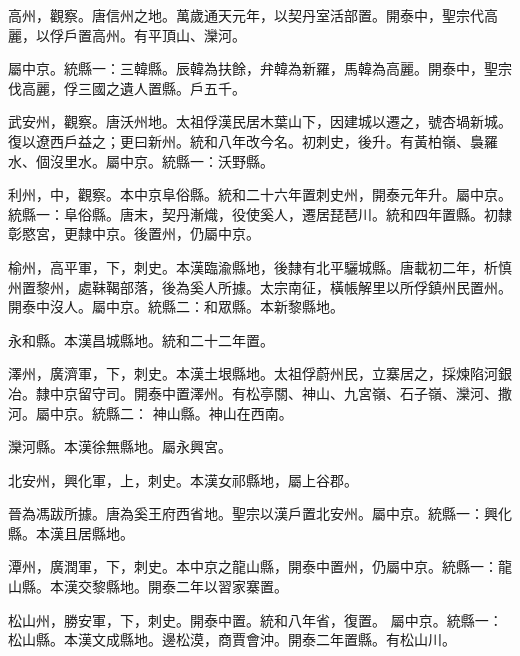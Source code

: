 \begin{pinyinscope}
 高州，觀察。唐信州之地。萬歲通天元年，以契丹室活部置。開泰中，聖宗代高麗，以俘戶置高州。有平頂山、灤河。



 屬中京。統縣一：三韓縣。辰韓為扶餘，弁韓為新羅，馬韓為高麗。開泰中，聖宗伐高麗，俘三國之遺人置縣。戶五千。



 武安州，觀察。唐沃州地。太祖俘漢民居木葉山下，因建城以遷之，號杏堝新城。復以遼西戶益之；更曰新州。統和八年改今名。初刺史，後升。有黃柏嶺、裊羅水、個沒里水。屬中京。統縣一：沃野縣。



 利州，中，觀察。本中京阜俗縣。統和二十六年置刺史州，開泰元年升。屬中京。統縣一：阜俗縣。唐末，契丹漸熾，役使奚人，遷居琵琶川。統和四年置縣。初隸彰愍宮，更隸中京。後置州，仍屬中京。



 榆州，高平軍，下，刺史。本漢臨渝縣地，後隸有北平驪城縣。唐載初二年，析慎州置黎州，處靺鞨部落，後為奚人所據。太宗南征，橫帳解里以所俘鎮州民置州。開泰中沒人。屬中京。統縣二：和眾縣。本新黎縣地。



 永和縣。本漢昌城縣地。統和二十二年置。



 澤州，廣濟軍，下，刺史。本漢土垠縣地。太祖俘蔚州民，立寨居之，採煉陷河銀冶。隸中京留守司。開泰中置澤州。有松亭關、神山、九宮嶺、石子嶺、灤河、撒河。屬中京。統縣二：
 神山縣。神山在西南。



 灤河縣。本漢徐無縣地。屬永興宮。



 北安州，興化軍，上，刺史。本漢女祁縣地，屬上谷郡。



 晉為馮跋所據。唐為奚王府西省地。聖宗以漢戶置北安州。屬中京。統縣一：興化縣。本漢且居縣地。



 潭州，廣潤軍，下，刺史。本中京之龍山縣，開泰中置州，仍屬中京。統縣一：龍山縣。本漢交黎縣地。開泰二年以習家寨置。



 松山州，勝安軍，下，刺史。開泰中置。統和八年省，復置。
 屬中京。統縣一：松山縣。本漢文成縣地。邊松漠，商賈會沖。開泰二年置縣。有松山川。




\end{pinyinscope}
